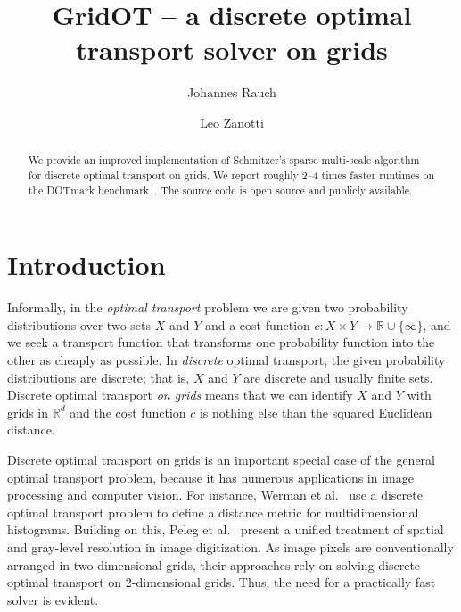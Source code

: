 \documentclass[a4paper,UKenglish,cleveref, autoref, thm-restate]{lipics-v2021}
\title{GridOT -- a discrete optimal transport solver on grids}
\author{Johannes Rauch}
{Ulm University, Institute of Optimization and Operations Research, Germany}
{johannes.rauch@uni-ulm.de}
{https://orcid.org/0000-0002-6925-8830}
{}%
\author{Leo Zanotti}
{Ulm University, Institute of Optimization and Operations Research, Germany}
{leo.zanotti@uni-ulm.de}
{https://orcid.org/0009-0001-9695-3812}
{}
\begin{document}
\maketitle

\begin{abstract}
We provide an improved implementation of Schmitzer's sparse multi-scale algorithm~\cite{schmitzer2016sparse} for discrete optimal transport on grids.
We report roughly 2--4 times faster runtimes on the DOTmark benchmark~\cite{schrieber2017dotmark}.
The source code is open source and publicly available.
\end{abstract}

\section{Introduction}\label{sec:intro}
Informally, in the \emph{optimal transport} problem we are given two probability distributions over two sets $X$ and $Y$ and a cost function $c: X \times Y \rightarrow \mathbb{R} \cup \{\infty\}$, and we seek a transport function that transforms one probability function into the other as cheaply as possible.
In \emph{discrete} optimal transport, the given probability distributions are discrete; that is, $X$ and $Y$ are discrete and usually finite sets.
Discrete optimal transport \emph{on grids} means that we can identify $X$ and $Y$ with grids in $\mathbb{R}^d$ and the cost function $c$ is nothing else than the squared Euclidean distance.

Discrete optimal transport on grids is an important special case of the general optimal transport problem, because it has numerous applications in image processing and computer vision.
For instance, Werman et al.~\cite{werman1985distance} use a discrete optimal transport problem to define a distance metric for multidimensional histograms.
Building on this, Peleg et al.~\cite{peleg1989unified} present a unified treatment of spatial and gray-level resolution in image digitization.
As image pixels are conventionally arranged in two-dimensional grids, their approaches rely on solving discrete optimal transport on 2-dimensional grids.
Thus, the need for a practically fast solver is evident.
\end{document}
